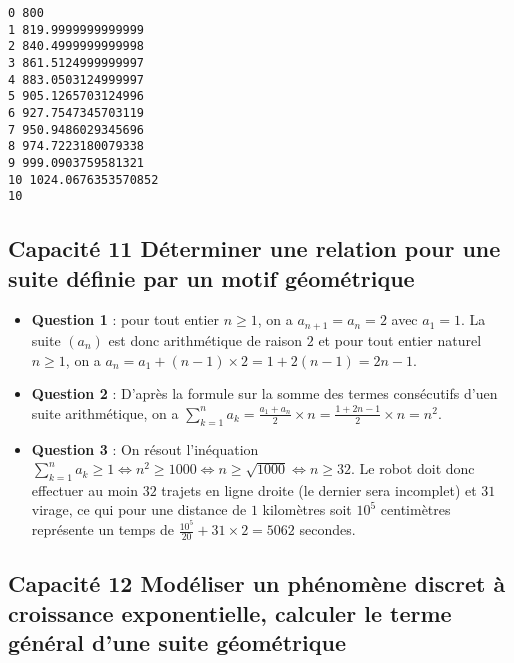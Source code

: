 \documentclass[11pt]{article}
\begin{document}
    \begin{Verbatim}[commandchars=\\\{\}]
0 800
1 819.9999999999999
2 840.4999999999998
3 861.5124999999997
4 883.0503124999997
5 905.1265703124996
6 927.7547345703119
7 950.9486029345696
8 974.7223180079338
9 999.0903759581321
10 1024.0676353570852
10

    \end{Verbatim}

    \subsection{Capacité 11 Déterminer une relation pour une suite définie
par un motif
géométrique}\label{capacituxe9-11-duxe9terminer-une-relation-pour-une-suite-duxe9finie-par-un-motif-guxe9omuxe9trique}

    \begin{itemize}
\item
  \textbf{Question 1} : pour tout entier \(n \geqslant 1\), on a
  \(a_{n+1}=a_{n}=2\) avec \(a_{1}=1\). La suite \(\left(a_{n}\right)\)
  est donc arithmétique de raison \(2\) et pour tout entier naturel
  \(n\geqslant 1\), on a \(a_{n}=a_{1} + (n-1) \times 2=1+2(n-1)=2n-1\).
\item
  \textbf{Question 2} : D'après la formule sur la somme des termes
  consécutifs d'uen suite arithmétique, on a
  \(\sum_{k=1}^{n}a_{k}=\frac{a_{1}+a_{n}}{2} \times n= \frac{1+2n-1}{2} \times n = n^{2}\).
\item
  \textbf{Question 3} : On résout l'inéquation
  \(\sum_{k=1}^{n}a_{k} \geqslant 1 \Longleftrightarrow n^{2} \geqslant 1000 \Longleftrightarrow n \geqslant \sqrt{1000} \Longleftrightarrow n \geqslant 32\).
  Le robot doit donc effectuer au moin \(32\) trajets en ligne droite
  (le dernier sera incomplet) et \(31\) virage, ce qui pour une distance
  de \(1\) kilomètres soit \(10^{5}\) centimètres représente un temps de
  \(\frac{10^{5}}{20} + 31 \times 2 =5062\) secondes.
\end{itemize}

    \subsection{Capacité 12 Modéliser un phénomène discret à croissance
exponentielle, calculer le terme général d'une suite
géométrique}\label{capacituxe9-12-moduxe9liser-un-phuxe9nomuxe8ne-discret-uxe0-croissance-exponentielle-calculer-le-terme-guxe9nuxe9ral-dune-suite-guxe9omuxe9trique}
\end{document}
